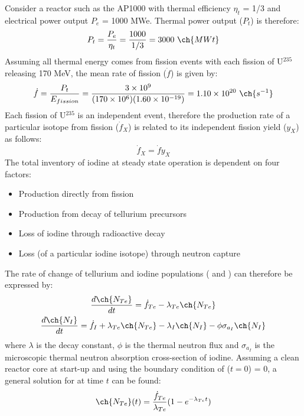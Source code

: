\documentclass[a4paper,12pt,twoside]{report}
\begin{document}
Consider a reactor such as the AP1000 with thermal efficiency $\eta_{t}$ = 1/3 and electrical power output $P_{e}$ = 1000 MWe. Thermal power output ($P_{t}$) is therefore:
\begin{equation}
P_{t} = \frac{P_{e}}{\eta_{t}} = \frac{1000}{1/3} = 3000 \ \ch{MWt}
\end{equation}
Assuming all thermal energy comes from fission events with each fission of U$^{235}$ releasing 170 MeV, the mean rate of fission ($\dot{f}$) is given by:
\begin{equation}
\dot{f} = \frac{P_{t}}{E_{fission}} = \frac{3 \times 10^{9}}{(170 \times 10^{6})(1.60 \times 10^{-19})} = 1.10 \times 10^{20} \ \ch{s^{-1}}
\end{equation}
Each fission of U$^{235}$ is an independent event, therefore the production rate of a particular isotope from fission ($\dot{f}_{X}$) is related to its independent fission yield ($y_{X}$) as follows:
\begin{equation}
\dot{f}_{X} = \dot{f}y_{X}
\end{equation}
The total inventory of iodine at steady state operation is dependent on four factors:
\begin{itemize}
\item Production directly from fission
\item Production from decay of tellurium precursors
\item Loss of iodine through radioactive decay
\item Loss (of a particular iodine isotope) through neutron capture
\end{itemize}
The rate of change of tellurium and iodine populations ( and ) can therefore be expressed by:
\begin{gather}
\frac{d\ch{N_{Te}}}{dt} = \dot{f}_{Te} - \lambda_{Te}\ch{N_{Te}} \\
\frac{d\ch{N_{I}}}{dt} = \dot{f}_{I} + \lambda_{Te}\ch{N_{Te}} - \lambda_{I}\ch{N_{I}} - \phi\sigma_{a_{I}}\ch{N_{I}}
\end{gather}
where $\lambda$ is the decay constant, $\phi$ is the thermal neutron flux and $\sigma_{a_{I}}$ is the microscopic thermal neutron absorption cross-section of iodine. Assuming a clean reactor core at start-up and using the boundary condition of ($t=0$) = 0, a general solution for  at time $t$ can be found:
\begin{equation}
\ch{N_{Te}}(t) = \frac{\dot{f}_{Te}}{\lambda_{Te}}(1 - e^{-\lambda_{Te}t})
\end{equation}
\end{document}
